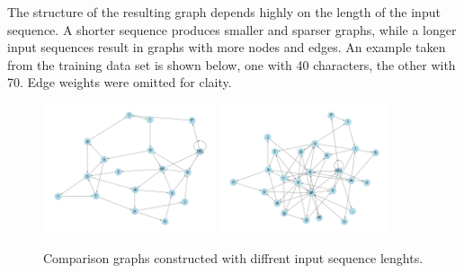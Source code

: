 The structure of the resulting graph depends highly on the length of the input sequence. A shorter sequence produces smaller and sparser graphs, while a longer input sequences result in graphs with more nodes and edges. An example taken from the training data set is shown below, one with 40 characters, the other with 70. Edge weights were omitted for claity.

\begin{figure}[H]
	\centering
	\includegraphics[width=0.45\textwidth]{images/len40_graph_other_layout.png}
	\includegraphics[width=0.45\textwidth]{images/len70_graph_other_layout.png}
	\caption{Comparison graphs constructed with diffrent input sequence lenghts.}%
	\label{fig:multiple graphs}%
\end{figure}


